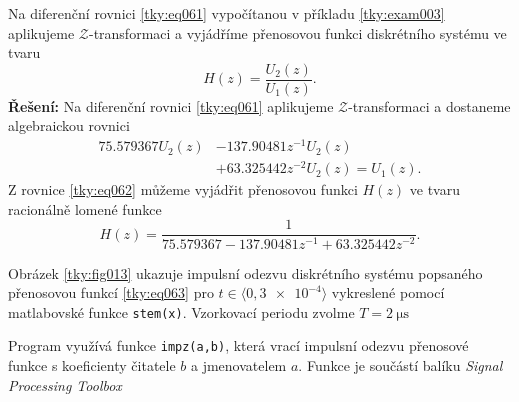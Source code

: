 \begin{mdframed}[style=mdexam]
  \begin{example}\label{tky:exam004}
    Na diferenční rovnici \ref{tky:eq061} vypočítanou v příkladu \ref{tky:exam003} aplikujeme
    \(\mathcal{Z}\)-transformaci a vyjádříme přenosovou funkci diskrétního systému ve tvaru
    \begin{equation*}
      H(z) = \dfrac{U_2(z)}{U_1(z)}.
    \end{equation*}
    \noindent\textbf{Řešení:}
    Na diferenční rovnici \ref{tky:eq061} aplikujeme \(\mathcal{Z}\)-transformaci a dostaneme
    algebraickou rovnici
    \begin{align}
      \num{75.579367}U_2(z) &- \num{137.90481}z^{-1}U_2(z)                       \nonumber \\
                            &+ \num{63.325442}z^{-2}U_2(z) = U_1(z).             \label{tky:eq062}
    \end{align}
    Z rovnice \ref{tky:eq062} můžeme vyjádřit přenosovou funkci \(H(z)\) ve tvaru racionálně lomené
    funkce
    \begin{equation}\label{tky:eq063}
      H(z) = \dfrac{1}{\num{75.579367}-\num{137.90481}z^{-1}+\num{63.325442}z^{-2}}.
    \end{equation}
    
    {\centering
      \captionsetup{type=figure}
      \label{tky:fig013}
    \par}
    Obrázek \ref{tky:fig013} ukazuje impulsní odezvu diskrétního systému popsaného přenosovou funkcí
    \ref{tky:eq063} pro \(t\in\langle0,\num{3e-4}\rangle\) vykreslené pomocí matlabovské funkce
    \lstinline[style=luaMatlabText]!stem(x)!. Vzorkovací periodu zvolme \(T = \qty{2}{\us}\)

    Program využívá funkce \lstinline[style=luaMatlabText]!impz(a,b)!, která vrací impulsní odezvu
    přenosové funkce s koeficienty čitatele \(b\) a jmenovatelem \(a\). Funkce je součástí balíku 
    \emph{Signal Processing Toolbox}    
  \end{example} 

  
\end{mdframed}
